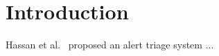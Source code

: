 \section{Introduction}
\label{s:intro}

Hassan et al.~\cite{nodoze2019} proposed an alert triage system ...